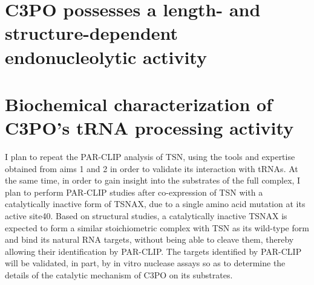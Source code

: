 \documentclass[12pt]{rockefeller}
\begin{document}
\section{C3PO possesses a length- and structure-dependent endonucleolytic activity}

\section{Biochemical characterization of C3PO’s tRNA processing activity}
I plan to repeat the PAR-CLIP analysis of TSN, using the tools and expertise obtained from aims 1 and 2 in order to validate its interaction with tRNAs. At the same time, in order to gain insight into the substrates of the full complex, I plan to perform PAR-CLIP studies after co-expression of TSN with a catalytically inactive form of TSNAX, due to a single amino acid mutation at its active site40. Based on structural studies, a catalytically inactive TSNAX is expected to form a similar stoichiometric complex with TSN as its wild-type form and bind its natural RNA targets, without being able to cleave them, thereby allowing their identification by PAR-CLIP. The targets identified by PAR-CLIP will be validated, in part, by in vitro nuclease assays so as to determine the details of the catalytic mechanism of C3PO on its substrates. 
\end{document}
